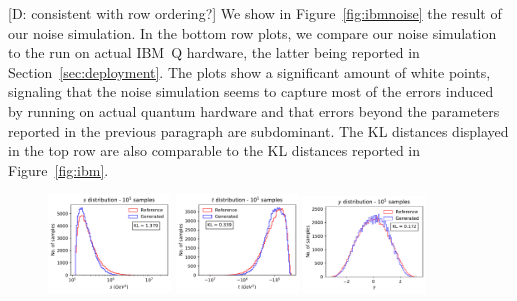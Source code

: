 \documentclass[twocolumn,preprintnumbers,superscriptaddress]{revtex4-2}
\newcommand{\commentDMG}[1]{{\color{orange} {[D: #1]}}}
\begin{document}
\commentDMG{consistent with row ordering?}
We show in Figure~\ref{fig:ibmnoise} the result of our noise simulation. In the bottom row plots, we compare our noise simulation
to the run on actual IBM~Q hardware, the latter being reported in Section~\ref{sec:deployment}. The plots show a significant amount
of white points, signaling that the noise simulation seems to capture most of the errors induced by running on actual quantum
hardware and that errors beyond the parameters reported in the previous paragraph are subdominant. The KL distances displayed in
the top row are also comparable to the KL distances reported in Figure~\ref{fig:ibm}. 

\begin{figure}

  \includegraphics[width=0.29\textwidth]{plots/hardware_noise_simulation/s-distribution_LHCdata_100k_noise-simu.pdf}%
  \includegraphics[width=0.29\textwidth]{plots/hardware_noise_simulation/t-distribution_LHCdata_100k_noise-simu.pdf}%
  \includegraphics[width=0.29\textwidth]{plots/hardware_noise_simulation/y-distribution_LHCdata_100k_noise-simu.pdf}
  

\end{figure}
\end{document}
